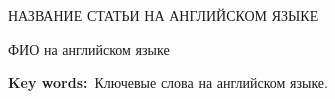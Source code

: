 
 \bigskip


 \begin{center}
 НАЗВАНИЕ СТАТЬИ НА АНГЛИЙСКОМ ЯЗЫКЕ
 \end{center}
 \begin{center}
  ФИО на английском языке
 \end{center}


\vspace*{-4pt}

{\noindent\footnotesize {\bf Key
 words:}~Ключевые слова на английском языке.\par}


